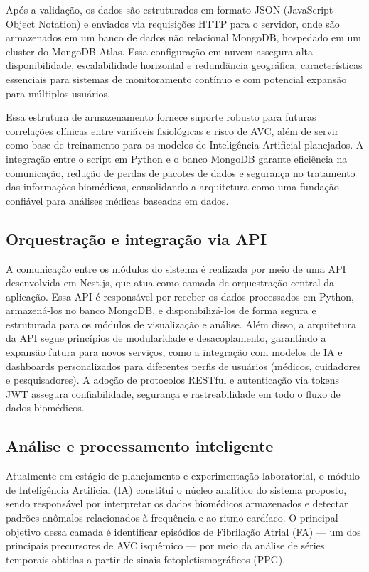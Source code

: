 Após a validação, os dados são estruturados em formato JSON (JavaScript Object Notation) e enviados via requisições HTTP para o servidor, onde são armazenados em um banco de dados não relacional MongoDB, hospedado em um cluster do MongoDB Atlas. Essa configuração em nuvem assegura alta disponibilidade, escalabilidade horizontal e redundância geográfica, características essenciais para sistemas de monitoramento contínuo e com potencial expansão para múltiplos usuários.

Essa estrutura de armazenamento fornece suporte robusto para futuras correlações clínicas entre variáveis fisiológicas e risco de AVC, além de servir como base de treinamento para os modelos de Inteligência Artificial planejados. A integração entre o script em Python e o banco MongoDB garante eficiência na comunicação, redução de perdas de pacotes de dados e segurança no tratamento das informações biomédicas, consolidando a arquitetura como uma fundação confiável para análises médicas baseadas em dados.

\subsection*{Orquestração e integração via API}

A comunicação entre os módulos do sistema é realizada por meio de uma API desenvolvida em Nest.js, que atua como camada de orquestração central da aplicação. Essa API é responsável por receber os dados processados em Python, armazená-los no banco MongoDB, e disponibilizá-los de forma segura e estruturada para os módulos de visualização e análise.
Além disso, a arquitetura da API segue princípios de modularidade e desacoplamento, garantindo a expansão futura para novos serviços, como a integração com modelos de IA e dashboards personalizados para diferentes perfis de usuários (médicos, cuidadores e pesquisadores). A adoção de protocolos RESTful e autenticação via tokens JWT assegura confiabilidade, segurança e rastreabilidade em todo o fluxo de dados biomédicos.

\subsection*{Análise e processamento inteligente}

Atualmente em estágio de planejamento e experimentação laboratorial, o módulo de Inteligência Artificial (IA) constitui o núcleo analítico do sistema proposto, sendo responsável por interpretar os dados biomédicos armazenados e detectar padrões anômalos relacionados à frequência e ao ritmo cardíaco. O principal objetivo dessa camada é identificar episódios de Fibrilação Atrial (FA) — um dos principais precursores de AVC isquêmico — por meio da análise de séries temporais obtidas a partir de sinais fotopletismográficos (PPG).

